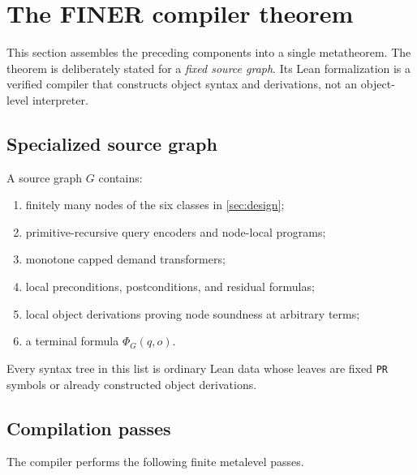 \section{The FINER compiler theorem}
\label{sec:compiler}

This section assembles the preceding components into a single metatheorem.  The theorem is deliberately stated for a \emph{fixed source graph}.  Its Lean formalization is a verified compiler that constructs object syntax and derivations, not an object-level interpreter.

\subsection{Specialized source graph}

A source graph \(G\) contains:
\begin{enumerate}[label=(\roman*),leftmargin=2.3em]
\item finitely many nodes of the six classes in \cref{sec:design};
\item primitive-recursive query encoders and node-local programs;
\item monotone capped demand transformers;
\item local preconditions, postconditions, and residual formulas;
\item local object derivations proving node soundness at arbitrary terms;
\item a terminal formula \(\Phi_G(q,o)\).
\end{enumerate}
Every syntax tree in this list is ordinary Lean data whose leaves are fixed \texttt{PR} symbols or already constructed object derivations.

\subsection{Compilation passes}

The compiler performs the following finite metalevel passes.

